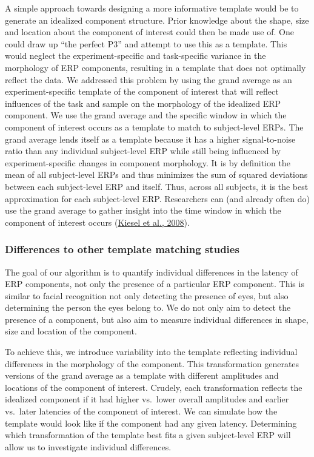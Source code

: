 \documentclass[
  man,floatsintext]{apa7}
\begin{document}
A simple approach towards designing a more informative template would be to generate an idealized component structure. Prior knowledge about the shape, size and location about the component of interest could then be made use of. One could draw up ``the perfect P3'' and attempt to use this as a template. This would neglect the experiment-specific and task-specific variance in the morphology of ERP components, resulting in a template that does not optimally reflect the data. We addressed this problem by using the grand average as an experiment-specific template of the component of interest that will reflect influences of the task and sample on the morphology of the idealized ERP component. We use the grand average and the specific window in which the component of interest occurs as a template to match to subject-level ERPs. The grand average lends itself as a template because it has a higher signal-to-noise ratio than any individual subject-level ERP while still being influenced by experiment-specific changes in component morphology. It is by definition the mean of all subject-level ERPs and thus minimizes the sum of squared deviations between each subject-level ERP and itself. Thus, across all subjects, it is the best approximation for each subject-level ERP. Researchers can (and already often do) use the grand average to gather insight into the time window in which the component of interest occurs (\protect\hyperlink{ref-kiesel2008measurement}{Kiesel et al., 2008}).

\hypertarget{differences-to-other-template-matching-studies}{%
\subsubsection{Differences to other template matching studies}\label{differences-to-other-template-matching-studies}}

The goal of our algorithm is to quantify individual differences in the latency of ERP components, not only the presence of a particular ERP component. This is similar to facial recognition not only detecting the presence of eyes, but also determining the person the eyes belong to. We do not only aim to detect the presence of a component, but also aim to measure individual differences in shape, size and location of the component.

To achieve this, we introduce variability into the template reflecting individual differences in the morphology of the component. This transformation generates versions of the grand average as a template with different amplitudes and locations of the component of interest. Crudely, each transformation reflects the idealized component if it had higher vs.~lower overall amplitudes and earlier vs.~later latencies of the component of interest. We can simulate how the template would look like if the component had any given latency. Determining which transformation of the template best fits a given subject-level ERP will allow us to investigate individual differences.
\end{document}
